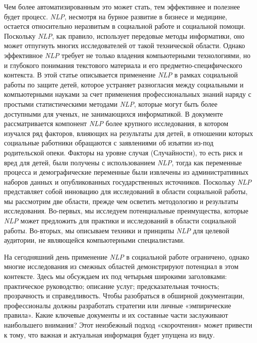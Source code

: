 \documentclass[a4paper,10pt]{article}
\begin{document}
    Чем более автоматизированным это может стать, тем эффективнее и полезнее будет процесс. 
    \textit{NLP}, несмотря на бурное развитие в бизнесе и медицине, остается относительно неразвитым в социальной работе и социальной помощи. 
    Поскольку \textit{NLP}, как правило, использует передовые методы информатики, оно может отпугнуть многих исследователей от такой технической области. 
    Однако эффективное \textit{NLP} требует не только владения компьютерными технологиями, но и глубокого понимания текстового материала и его предметно-специфического контекста. 
    В этой статье описывается применение \textit{NLP} в рамках социальной работы по защите детей, которое устраняет разногласия между социальными и компьютерными науками за счет применения профессиональных знаний наряду с простыми статистическими методами \textit{NLP}, которые могут быть более доступными для ученых, не занимающихся информатикой. 
    В документе рассматривается компонент \textit{NLP} более крупного исследования, в котором изучался ряд факторов, влияющих на результаты для детей, в отношении которых социальные работники обращаются с заявлениями об изъятии из-под родительской опеки. 
    Факторы на уровне случая (Случайности), то есть риск и вред для детей, были получены с использованием \textit{NLP}, тогда как переменные процесса и демографические переменные были извлечены из административных наборов данных и опубликованных государственных источников. 
    Поскольку \textit{NLP} представляет собой инновацию для исследований в области социальной работы, мы рассмотрим две области, прежде чем осветить методологию и результаты исследования. 
    Во-первых, мы исследуем потенциальные преимущества, которые \textit{NLP} может предложить для практики и исследований в области социальной работы. 
    Во-вторых, мы описываем техники и принципы \textit{NLP} для целевой аудитории, не являющейся компьютерными специалистами.
    \par\hrulefill\par
    На сегодняшний день применение \textit{NLP} в социальной работе ограничено, однако многие исследования из смежных областей демонстрируют потенциал в этом контексте. 
    Здесь мы обсуждаем их под четырьмя широкими заголовками: практическое руководство; описание услуг; предсказательная точность; прозрачность и справедливость. 
    Чтобы разобраться в обширной документации, профессионалы должны разработать стратегии или личные «эмпирические правила». 
    Какие ключевые документы и их составные части заслуживают наибольшего внимания? 
    Этот неизбежный подход «скорочтения» может привести к тому, что важная и актуальная информация будет упущена из виду. 
\end{document}
